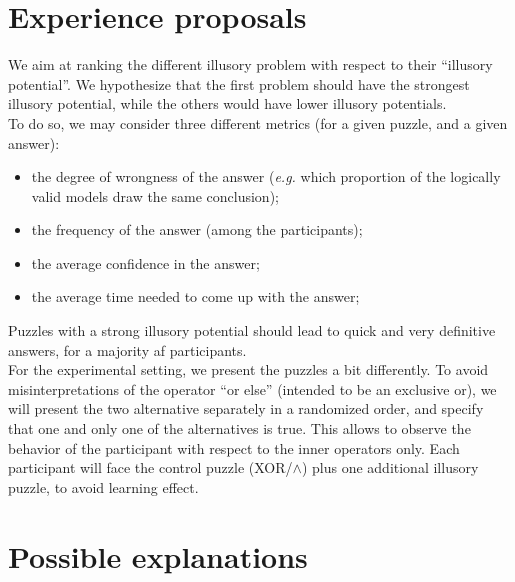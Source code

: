 \documentclass[french]{article}
\begin{document}
\section{Experience proposals}
We aim at ranking the different illusory problem with respect to their ``illusory potential''. We hypothesize that the first problem should have the strongest illusory potential, while the others would have lower illusory potentials.\\
To do so, we may consider three different metrics (for a given puzzle, and a given answer):
\begin{itemize}
	\item the degree of wrongness of the answer (\textit{e.g.} which proportion of the logically valid models draw the same conclusion);
	\item the frequency of the answer (among the participants);
	\item the average confidence in the answer;
	\item the average time needed to come up with the answer;
\end{itemize}
Puzzles with a strong illusory potential should lead to quick and very definitive answers, for a majority af participants.\\
For the experimental setting, we present the puzzles a bit differently. To avoid misinterpretations of the operator ``or else'' (intended to be an exclusive or), we will present the two alternative separately in a randomized order, and specify that one and only one of the alternatives is true. This allows to observe the behavior of the participant with respect to the inner operators only. Each participant will face the control puzzle (XOR/$\wedge$) plus one additional illusory puzzle, to avoid learning effect.
\section{Possible explanations}
\end{document}
